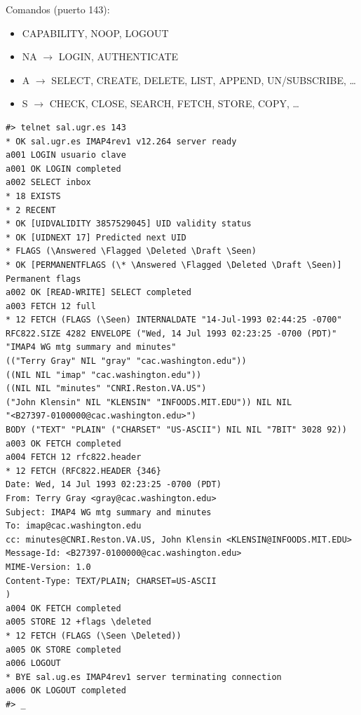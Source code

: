 \documentclass[a4paper,11pt]{article}
\begin{document}
Comandos (puerto 143):
\begin{itemize}
\item CAPABILITY, NOOP, LOGOUT
\item NA $\rightarrow$ LOGIN, AUTHENTICATE
\item A $\rightarrow$ SELECT, CREATE, DELETE, LIST, APPEND, UN/SUBSCRIBE, \ldots
\item S $\rightarrow$ CHECK, CLOSE, SEARCH, FETCH, STORE, COPY, \ldots
\end{itemize}

\begin{verbatim}
#> telnet sal.ugr.es 143
* OK sal.ugr.es IMAP4rev1 v12.264 server ready
a001 LOGIN usuario clave
a001 OK LOGIN completed
a002 SELECT inbox
* 18 EXISTS
* 2 RECENT
* OK [UIDVALIDITY 3857529045] UID validity status
* OK [UIDNEXT 17] Predicted next UID
* FLAGS (\Answered \Flagged \Deleted \Draft \Seen)
* OK [PERMANENTFLAGS (\* \Answered \Flagged \Deleted \Draft \Seen)] Permanent flags
a002 OK [READ-WRITE] SELECT completed
a003 FETCH 12 full
* 12 FETCH (FLAGS (\Seen) INTERNALDATE "14-Jul-1993 02:44:25 -0700"
RFC822.SIZE 4282 ENVELOPE ("Wed, 14 Jul 1993 02:23:25 -0700 (PDT)"
"IMAP4 WG mtg summary and minutes"
(("Terry Gray" NIL "gray" "cac.washington.edu"))
((NIL NIL "imap" "cac.washington.edu"))
((NIL NIL "minutes" "CNRI.Reston.VA.US")
("John Klensin" NIL "KLENSIN" "INFOODS.MIT.EDU")) NIL NIL
"<B27397-0100000@cac.washington.edu>")
BODY ("TEXT" "PLAIN" ("CHARSET" "US-ASCII") NIL NIL "7BIT" 3028 92))
a003 OK FETCH completed
a004 FETCH 12 rfc822.header
* 12 FETCH (RFC822.HEADER {346}
Date: Wed, 14 Jul 1993 02:23:25 -0700 (PDT)
From: Terry Gray <gray@cac.washington.edu>
Subject: IMAP4 WG mtg summary and minutes
To: imap@cac.washington.edu
cc: minutes@CNRI.Reston.VA.US, John Klensin <KLENSIN@INFOODS.MIT.EDU>
Message-Id: <B27397-0100000@cac.washington.edu>
MIME-Version: 1.0
Content-Type: TEXT/PLAIN; CHARSET=US-ASCII
)
a004 OK FETCH completed
a005 STORE 12 +flags \deleted
* 12 FETCH (FLAGS (\Seen \Deleted))
a005 OK STORE completed
a006 LOGOUT
* BYE sal.ug.es IMAP4rev1 server terminating connection
a006 OK LOGOUT completed
#> _ 

\end{verbatim}
\end{document}
